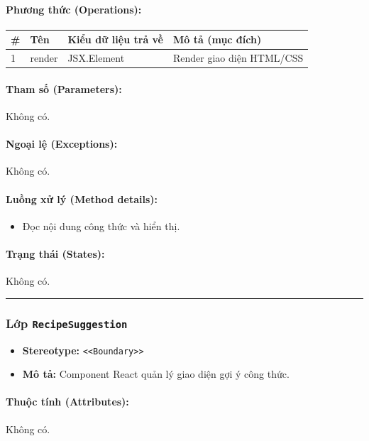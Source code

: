 \documentclass[12pt,a4paper]{article}
\begin{document}
\paragraph{Phương thức (Operations):}
\begin{longtable}{|p{0.6cm}|p{3.8cm}|p{2.6cm}|p{6.5cm}|}
\hline
\textbf{\#} & \textbf{Tên} & \textbf{Kiểu dữ liệu trả về} & \textbf{Mô tả (mục đích)} \\ \hline
\endhead
1 & render & JSX.Element & Render giao diện HTML/CSS \\ \hline
\end{longtable}

\paragraph{Tham số (Parameters):}
Không có.

\paragraph{Ngoại lệ (Exceptions):}
Không có.

\paragraph{Luồng xử lý (Method details):}
\begin{itemize}[leftmargin=*]
    \item Đọc nội dung công thức và hiển thị.
\end{itemize}


\paragraph{Trạng thái (States):}
Không có.

\vskip 0.5cm
\noindent\rule{\textwidth}{0.5pt}
\vskip 0.5cm

\subsubsection{Lớp \texttt{RecipeSuggestion}}
\begin{itemize}[leftmargin=*]
    \item \textbf{Stereotype:} \texttt{\textless{}\textless{}Boundary\textgreater{}\textgreater{}}
    \item \textbf{Mô tả:} Component React quản lý giao diện gợi ý công thức.
\end{itemize}

\paragraph{Thuộc tính (Attributes):}
Không có.
\end{document}
